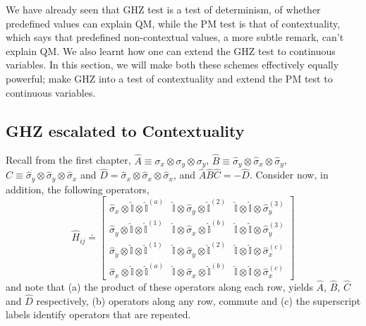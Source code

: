 We have already seen that GHZ test is a test of determinism, of whether
predefined values can explain QM, while the PM test is that of contextuality,
which says that predefined non-contextual values, a more subtle remark,
can't explain QM. We also learnt how one can extend the GHZ test to
continuous variables. In this section, we will make both these schemes
effectively equally powerful; make GHZ into a test of contextuality
and extend the PM test to continuous variables. 


\subsection{GHZ escalated to Contextuality \label{sub:GHZ-to-contextuality}}

Recall from the first chapter, $\hat{A}\equiv\sigma_{x}\otimes\sigma_{y}\otimes\sigma_{y}$,
$\hat{B}\equiv\hat{\sigma}_{y}\otimes\hat{\sigma}_{x}\otimes\hat{\sigma}_{y}$,
$\hat{C}\equiv\hat{\sigma}_{y}\otimes\hat{\sigma}_{y}\otimes\hat{\sigma}_{x}$
and $\hat{D}=\hat{\sigma}_{x}\otimes\hat{\sigma}_{x}\otimes\hat{\sigma}_{x}$,
and $\hat{A}\hat{B}\hat{C}=-\hat{D}$. Consider now, in addition,
the following operators, 
\[
\hat{H}_{ij}\doteq\left[\begin{array}{ccc}
\hat{\sigma}_{x}\otimes\hat{\mathbb{I}}\otimes\hat{\mathbb{I}}^{(a)} & \hat{\mathbb{I}}\otimes\hat{\sigma}_{y}\otimes\hat{\mathbb{I}}^{(2)} & \mathbb{\hat{I}}\otimes\mathbb{\hat{I}}\otimes\hat{\sigma}_{y}^{(3)}\\
\hat{\sigma}_{y}\otimes\mathbb{\hat{I}}\otimes\hat{\mathbb{I}}^{(1)} & \hat{\mathbb{I}}\otimes\hat{\sigma}_{x}\otimes\hat{\mathbb{I}}^{(b)} & \mathbb{\hat{I}}\otimes\hat{\mathbb{I}}\otimes\hat{\sigma}_{y}^{(3)}\\
\hat{\sigma}_{y}\otimes\mathbb{\hat{I}}\otimes\hat{\mathbb{I}}^{(1)} & \mathbb{\hat{I}}\otimes\hat{\sigma}_{y}\otimes\hat{\mathbb{I}}^{(2)} & \mathbb{\hat{I}}\otimes\hat{\mathbb{I}}\otimes\hat{\sigma}_{x}^{(c)}\\
\hat{\sigma}_{x}\otimes\mathbb{\hat{I}}\otimes\hat{\mathbb{I}}^{(a)} & \mathbb{\hat{I}}\otimes\hat{\sigma}_{x}\otimes\hat{\mathbb{I}}^{(b)} & \hat{\mathbb{I}}\otimes\hat{\mathbb{I}}\otimes\hat{\sigma}_{x}^{(c)}
\end{array}\right]
\]
and note that (a) the product of these operators along each row, yields
$\hat{A}$, $\hat{B}$, $\hat{C}$ and $\hat{D}$ respectively, (b)
operators along any row, commute and (c) the superscript labels identify
operators that are repeated. 

